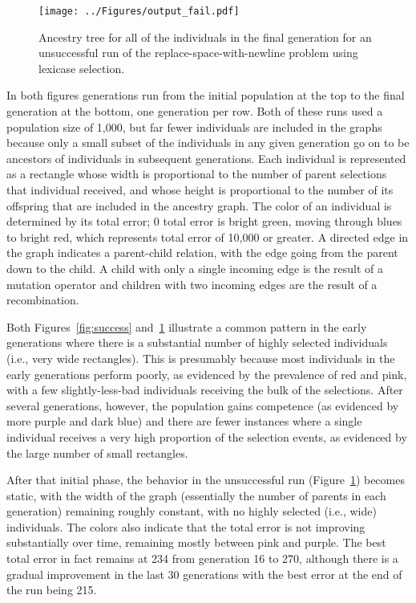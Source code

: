 \begin{figure}[p]
	\centering
	\texttt{[image: ../Figures/output\_fail.pdf]}
	\caption{Ancestry tree for all of the individuals in the final generation for an unsuccessful run of the replace-space-with-newline problem using lexicase selection.}
	\label{fig:fail}
\end{figure}

In both figures generations run from the initial population at the top to the final generation at the bottom, one generation per row. Both of these runs used a population size of 1,000, but far fewer individuals are included in the graphs because only a small subset of the individuals in any given generation go on to be ancestors of individuals in subsequent generations. Each individual is represented as a rectangle whose width is proportional to the number of parent selections that individual received, and whose height is proportional to the number of its offspring that are included in the ancestry graph. 
The color of an individual is determined by its total error; 0 total error is bright green, moving through blues to bright red, which represents total error of 10,000 or greater. A directed edge in the graph indicates a parent-child relation, with the edge going from the parent down to the child. A child with only a single incoming edge is the result of a mutation operator and children with two incoming edges are the result of a recombination.

Both Figures~\ref{fig:success} and~\ref{fig:fail} illustrate a common pattern in the early generations where there is a substantial number of highly selected individuals (i.e., very wide rectangles). This is presumably because most individuals in the early generations perform poorly, as evidenced by the prevalence of red and pink, with a few slightly-less-bad individuals receiving the bulk of the selections. After several generations, however, the population gains competence (as evidenced by more purple and dark blue) and there are fewer instances where a single individual receives a very high proportion of the selection events, as evidenced by the large number of small rectangles.

After that initial phase, the behavior in the unsuccessful run (Figure~\ref{fig:fail}) becomes static, with the width of the graph (essentially the number of parents in each generation) remaining roughly constant, with no highly selected (i.e., wide) individuals. The colors also indicate that the total error is not improving substantially over time, remaining mostly between pink and purple. The best total error in fact remains at 234 from generation 16 to 270, although there is a gradual improvement in the last 30 generations with the best error at the end of the run being 215.


